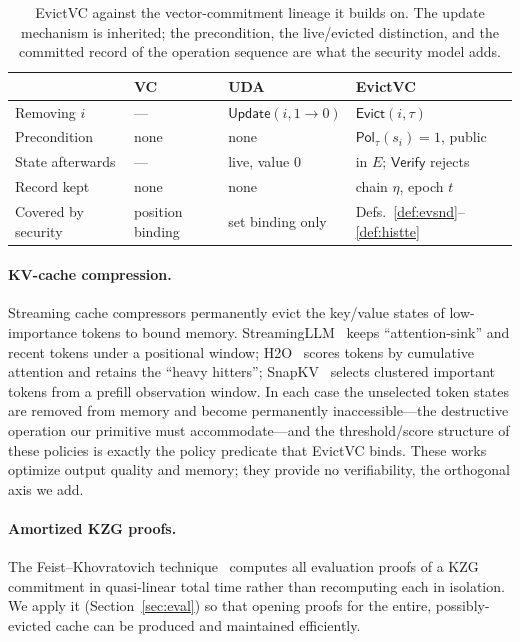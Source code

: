 \documentclass[version=preprint]{iacrcc}
\theoremstyle{definition}
\newcommand{\Vfy}{\mathsf{Verify}}
\newcommand{\Evict}{\mathsf{Evict}}
\newcommand{\Pol}{\mathsf{Pol}}
\newcommand{\Evicted}{E}
\begin{document}
\begin{table}[t]\centering
\renewcommand{\arraystretch}{1.1}
\small
\begin{tabular}{@{}llll@{}}
\toprule
 & VC~\cite{PKC:CatFio13} & UDA~\cite[\S6.1]{PKC:CatFio13} & EvictVC \\
\midrule
Removing $i$        & ---              & $\mathsf{Update}(i,1\!\to\!0)$ & $\Evict(i,\tau)$ \\
Precondition        & none             & none              & $\Pol_\tau(s_i)=1$, public \\
State afterwards    & ---              & live, value $0$   & in $\Evicted$; $\Vfy$ rejects \\
Record kept         & none             & none              & chain $\eta$, epoch $t$ \\
Covered by security & position binding & set binding only  & Defs.~\ref{def:evsnd}--\ref{def:histte} \\
\bottomrule
\end{tabular}
\caption{EvictVC against the vector-commitment lineage it builds on. The update
mechanism is inherited; the precondition, the live/evicted distinction, and the
committed record of the operation sequence are what the security model adds.}
\label{tab:vccmp}
\end{table}

\paragraph{KV-cache compression.}
Streaming cache compressors permanently evict the key/value states of
low-importance tokens to bound memory. StreamingLLM~\cite{streamingllm} keeps
``attention-sink'' and recent tokens under a positional window; H2O~\cite{h2o}
scores tokens by cumulative attention and retains the ``heavy hitters'';
SnapKV~\cite{snapkv} selects clustered important tokens from a prefill
observation window. In each case the unselected token states are removed from
memory and become permanently inaccessible---the destructive operation our
primitive must accommodate---and the threshold/score structure of these policies
is exactly the policy predicate that EvictVC binds. These works optimize output
quality and memory; they provide no verifiability, the orthogonal axis we add.

\paragraph{Amortized KZG proofs.}
The Feist--Khovratovich technique~\cite{EPRINT:FeiKho23} computes all evaluation proofs of a
KZG commitment in quasi-linear total time rather than recomputing each in
isolation. We apply it (Section~\ref{sec:eval}) so that opening proofs for the
entire, possibly-evicted cache can be produced and maintained efficiently.
\end{document}

